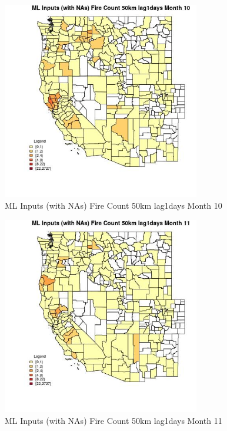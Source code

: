 \begin{figure} 
\centering  
\includegraphics[width=0.77\textwidth]{Code_Outputs/Report_ML_input_PM25_Step4_part_f_de_duplicated_aves_prioritize_24hr_obswNAs_CountyFire_Count_50km_lag1daysmedianMonth10.jpg} 
\caption{\label{fig:Report_ML_input_PM25_Step4_part_f_de_duplicated_aves_prioritize_24hr_obswNAsCountyFire_Count_50km_lag1daysmedianMonth10}ML Inputs (with NAs) Fire Count 50km lag1days Month 10} 
\end{figure} 
 

\clearpage 

\begin{figure} 
\centering  
\includegraphics[width=0.77\textwidth]{Code_Outputs/Report_ML_input_PM25_Step4_part_f_de_duplicated_aves_prioritize_24hr_obswNAs_CountyFire_Count_50km_lag1daysmedianMonth11.jpg} 
\caption{\label{fig:Report_ML_input_PM25_Step4_part_f_de_duplicated_aves_prioritize_24hr_obswNAsCountyFire_Count_50km_lag1daysmedianMonth11}ML Inputs (with NAs) Fire Count 50km lag1days Month 11} 
\end{figure} 
 

